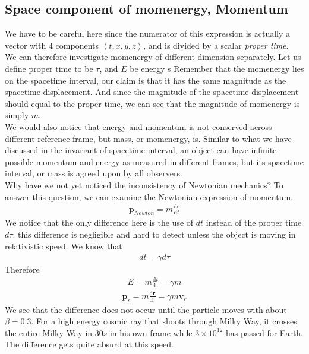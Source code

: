 \documentclass[11pt,letterpaper]{book}
\newcommand{\dydx}[2]{\frac{\text{d} #1}{\text{d} #2}}
\newcommand{\tribkt}[1]{\left< #1 \right>}
\begin{document}
\subsection{Space component of momenergy, Momentum}
We have to be careful here since the numerator of this expression is actually a vector with 4 components $\tribkt{t,x,y,z}$, and is divided by a scalar \textit{proper time}.\\

We can therefore investigate momenergy of different dimension separately. Let us define proper time to be $\tau$, and $E$ be energy
s
Remember that the momenergy lies on the spacetime interval, our claim is that it has the same magnitude as the spacetime displacement. And since the magnitude of the spacetime displacement should equal to the proper time, we can see that the magnitude of momenergy is simply $\textit{m}$.
\\

We would also notice that energy and momentum is not conserved across different reference frame, but mass, or momenergy, is. Similar to what we have discussed in the invariant of spacetime interval, an object can have infinite possible momentum and energy as measured in different frames, but its spacetime interval, or mass is agreed upon by all observers. \\

Why have we not yet noticed the inconsistency of Newtonian mechanics? To answer this question, we can examine the Newtonian expression of momentum. 
\begin{align}
\textbf{p}_{Newton} = m\dydx{\textbf{r}}{t}
\end{align}
We notice that the only difference here is the use of $dt$ instead of the proper time $d\tau$. this difference is negligible and hard to detect unless the object is moving in relativistic speed. We know that 
\begin{align}
dt = \gamma d\tau
\end{align}
Therefore 
\begin{align}
E = m \dydx{t}{\tau} = \gamma m
\end{align}
\begin{align}
\textbf{p}_r = m\dydx{\textbf{r}}{\tau} = \gamma m\textbf{v}_r
\end{align}
We see that the difference does not occur until the particle moves with about $\beta=0.3$. For a high energy cosmic ray that shoots through Milky Way, it crosses the entire Milky Way in $30s$ in his own frame while $3\times 10^{12}$ has passed for Earth. The difference gets quite absurd at this speed. 
\end{document}
